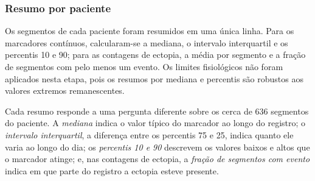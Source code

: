 \begin{table}[h!]
	\captionsetup{width=13cm}
\end{table}

\subsubsection{Resumo por paciente}
\label{subsubsec:met-b-resumo}

Os segmentos de cada paciente foram resumidos em uma única linha. Para os
marcadores contínuos, calcularam-se a mediana, o intervalo interquartil e os
percentis 10 e 90; para as contagens de ectopia, a média por segmento e a
fração de segmentos com pelo menos um evento. Os limites fisiológicos não
foram aplicados nesta etapa, pois os resumos por mediana e percentis são
robustos aos valores extremos remanescentes.

Cada resumo responde a uma pergunta diferente sobre os cerca de 636
segmentos do paciente. A \textit{mediana} indica o valor típico do marcador
ao longo do registro; o \textit{intervalo interquartil}, a diferença entre
os percentis 75 e 25, indica quanto ele varia ao longo do dia; os
\textit{percentis 10 e 90} descrevem os valores baixos e altos que o
marcador atinge; e, nas contagens de ectopia, a \textit{fração de segmentos
com evento} indica em que parte do registro a ectopia esteve presente.


